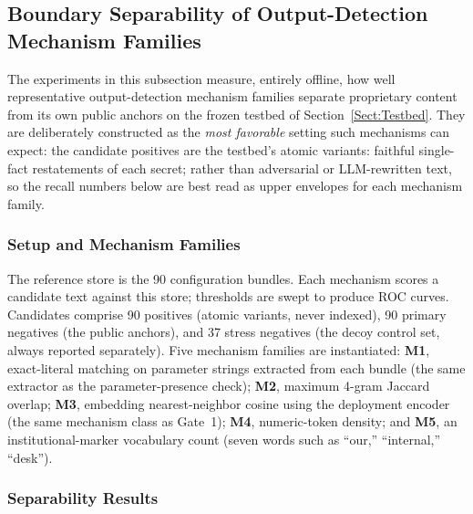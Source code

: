 \documentclass[journal]{IEEEtran}
\begin{document}
\subsection{Boundary Separability of Output-Detection Mechanism Families}
\label{Sect:V_E_BoundaryBench}

The experiments in this subsection measure, entirely offline, how well
representative output-detection mechanism families separate proprietary
content from its own public anchors on the frozen testbed of
Section~\ref{Sect:Testbed}. They are deliberately constructed as the
\emph{most favorable} setting such mechanisms can expect: the candidate
positives are the testbed's atomic variants: faithful single-fact
restatements of each secret; rather than adversarial or LLM-rewritten text,
so the recall numbers below are best read as upper envelopes for each
mechanism family.

\subsubsection{Setup and Mechanism Families}
The reference store is the 90 configuration bundles. Each mechanism scores a
candidate text against this store; thresholds are swept to produce ROC
curves. Candidates comprise 90 positives (atomic variants, never indexed),
90 primary negatives (the public anchors), and 37 stress negatives (the decoy
control set, always reported separately). Five mechanism families are
instantiated: \textbf{M1}, exact-literal matching on parameter strings
extracted from each bundle (the same extractor as the parameter-presence
check); \textbf{M2}, maximum 4-gram Jaccard overlap; \textbf{M3}, embedding
nearest-neighbor cosine using the deployment encoder (the same mechanism class
as Gate~1); \textbf{M4}, numeric-token density; and \textbf{M5}, an
institutional-marker vocabulary count (seven words such as ``our,''
``internal,'' ``desk'').

\subsubsection{Separability Results}
\label{Sect:V_E_1_D1}

\begin{table}[!t]
    \centering
    \caption{Boundary separability by mechanism family (primary negatives = 90 anchors). M1 is a binary mechanism and is reported as a single operating point.}
    \label{Tab:d1_auc}
\end{table}
\end{document}
